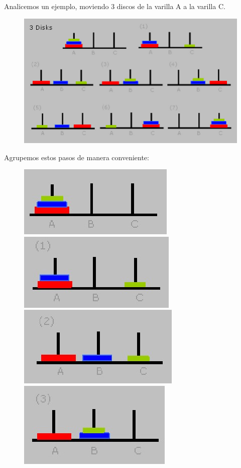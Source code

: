 Analicemos un ejemplo, moviendo 3 discos de la varilla A a la varilla C.

\begin{figure}[H]
	\centering
	\includegraphics[width=0.9\linewidth]{cp1/hanoi3/hanoi3.jpg}
\end{figure}

Agrupemos estos pasos de manera conveniente:

\begin{figure}[H]
	\centering
	\includegraphics[width=0.45\linewidth]{cp1/hanoi3/step-0.jpg}
	\includegraphics[width=0.41\linewidth]{cp1/hanoi3/step-1.jpg}
	\includegraphics[width=0.45\linewidth]{cp1/hanoi3/step-2.jpg}
	\includegraphics[width=0.41\linewidth]{cp1/hanoi3/step-3.jpg}
\end{figure}

